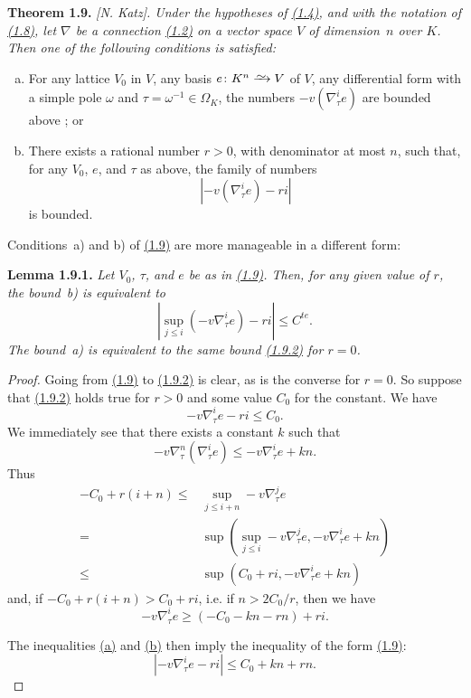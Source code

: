 \documentclass{report}
\newenvironment{itenv}[1]
  {\phantomsection\par\medskip\noindent\textbf{#1.}\itshape}
  {\par\medskip}
\newcommand{\simto}{\xrightarrow{\raisebox{-0.7ex}[0ex][0ex]{$\sim$}}}
\renewcommand{\geq}{\geqslant}
\renewcommand{\leq}{\leqslant}
\newcommand{\oldpage}[1]{\marginpar{\footnotesize$\Big\vert$ \textit{p.~#1}}}
\begin{document}
\begin{itenv}{Theorem 1.9}
\label{II.1.9}
  \emph{[N. Katz].}
  Under the hypotheses of \hyperref[II.1.4]{(1.4)}, and with the notation of \hyperref[II.1.8]{(1.8)}, let $\nabla$ be a connection \hyperref[II.1.2]{(1.2)} on a vector space $V$ of dimension~$n$ over $K$.
  Then one of the following conditions is satisfied:
  \begin{enumerate}[a)]
    \item For any lattice $V_0$ in $V$, any basis $e\colon K^n\simto V$ of $V$, any differential form with a simple pole $\omega$ and $\tau=\omega^{-1}\in\Omega_K$, the numbers $-v(\nabla_\tau^i e)$ are bounded above ; or
    \item There exists a rational number $r>0$, with denominator at most $n$, such that, for any $V_0$, $e$, and $\tau$ as above, the family of numbers
      \[
        |-v(\nabla_\tau^i e) - ri|
      \]
      is bounded.
  \end{enumerate}
\end{itenv}

Conditions~a) and b) of \hyperref[II.1.9]{(1.9)} are more manageable in a different form:

\begin{itenv}{Lemma 1.9.1}
\label{II.1.9.1}
  Let $V_0$, $\tau$, and $e$ be as in \hyperref[II.1.9]{(1.9)}.
  Then, for any given value of $r$, the bound~b) is equivalent to
  \[
  \label{II.1.9.2}
    |\sup_{j\leq i}(-v\nabla_\tau^i e)-ri| \leq C^{te}.
  \tag{1.9.2}
  \]
  The bound~a) is equivalent to the same bound \hyperref[II.1.9.2]{(1.9.2)} for $r=0$.
\end{itenv}

\begin{proof}
  Going from \hyperref[II.1.9]{(1.9)} to \hyperref[II.1.9.2]{(1.9.2)} is clear, as is the converse for $r=0$.
  So suppose that \hyperref[II.1.9.2]{(1.9.2)} holds true for $r>0$ and some value $C_0$ for the constant.
  We have
  \[
  \label{II.1.9.a}
    -v\nabla_\tau^i e - ri \leq C_0.
  \tag{a}
  \]
  We immediately see that there exists a constant $k$ such that
  \[
    -v\nabla_\tau^n(\nabla_\tau^i e) \leq -v\nabla_\tau^i e + kn.
  \]
\oldpage{46}
  Thus
  \[
    \begin{aligned}
      -C_0 + r(i+n)
      \leq& \sup_{j\leq i+n} -v\nabla_\tau^j e
    \\=& \sup(\sup_{j\leq i} -v\nabla_\tau^j e, -v\nabla_\tau^i e+kn)
    \\\leq& \sup(C_0+ri, -v\nabla_\tau^i e+kn)
    \end{aligned}
  \]
  and, if $-C_0+r(i+n) > C_0+ri$, i.e. if $n>2C_0/r$, then we have
  \[
  \label{II.1.9.b}
    -v\nabla_\tau^i e \geq (-C_0-kn-rn)+ri.
  \tag{b}
  \]

  The inequalities \hyperref[II.1.9.a]{(a)} and \hyperref[II.1.9.b]{(b)} then imply the inequality of the form \hyperref[II.1.9]{(1.9)}:
  \[
    |-v\nabla_\tau^i e - ri| \leq C_0+kn+rn.
  \]
\end{proof}
\end{document}
